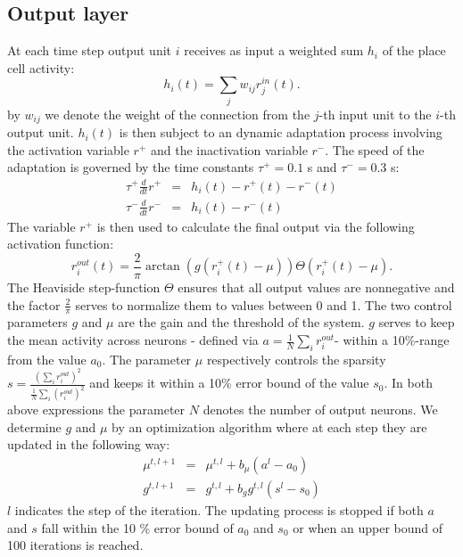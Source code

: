 \documentclass[a4paper, 12pt]{article}
\begin{document}
\subsection{Output layer}
At each time step output unit $i$ receives as input a weighted sum $h_i$ of the place cell activity: 
	\begin{equation}
	h_i(t)=\sum_jw_{ij}r_j^{in}(t).
	\end{equation}
by $w_{ij}$ we denote the weight of the connection from the $j$-th input unit to the $i$-th output unit. $h_i(t)$ is then subject to an dynamic adaptation process involving the activation variable $r^+$ and the inactivation variable $r^-$. The speed of the adaptation is governed by the time constants $\tau^+=0.1$ s and $\tau^-=0.3$ s:
	\begin{eqnarray}
	\tau^+\frac{d}{dt}r^+ &=& h_i(t)-r^+(t)-r^-(t)\\
	\tau^-\frac{d}{dt}r^- &=& h_i(t)-r^-(t)
	\end{eqnarray}
The variable $r^+$ is then used to calculate the final output via the following activation function: 
	\begin{equation}
	r_i^{out}(t)=\frac{2}{\pi}\arctan(g(r_i^+(t)-\mu))\Theta( r_i^+(t)-\mu).
	\end{equation}
The Heaviside step-function $\Theta$ ensures that all output values are nonnegative and the factor $\frac{2}{\pi}$ serves to normalize them to values between 0 and 1.  \newline
The two control parameters $g$ and $\mu$ are the gain and the threshold of the system. $g$ serves to keep the mean activity across neurons - defined via $a= \frac{1}{N}\sum_ir_i^{out}$- within a 10\%-range from the value $a_0$. The parameter $\mu$ respectively controls the sparsity $s=\frac{(\sum_ir_i^{out})^2}{\frac{1}{N}\sum_i (r_i^{out})^2}$ and keeps it within a 10\% error bound of the value $s_0$. In both above expressions the parameter $N$ denotes the number of output neurons. We determine $g$ and $\mu$ by an optimization algorithm where at each step they are updated in the following way: 
	\begin{eqnarray}
	\mu^{t, l+1} &=& \mu^{t,l}+b_\mu(a^{l}-a_0)\\
	g^{t,l+1} &=& g^{t,l}+ b_gg^{t,l}(s^l-s_0)
	\end{eqnarray}
\noindent $l$ indicates the step of the iteration. The updating process is stopped if both $a$ and $s$ fall within the 10 \% error bound of $a_0$ and $s_0$ or when an upper bound of 100 iterations is reached. 
	
\end{document}
